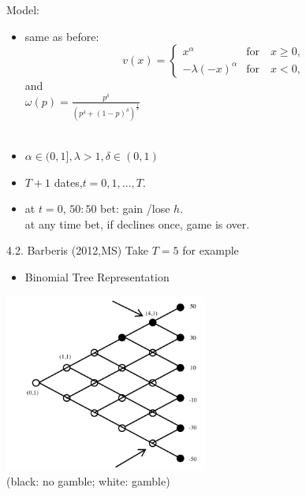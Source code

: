 \documentclass[11pt,aspectratio=169]{beamer}
\begin{document}
\begin{frame}{Model:}
    \begin{itemize}
    \item same as before:
        \begin{equation}
        v(x) = \begin{cases}
            x^\alpha  &  \text{for} \quad x \geq 0,\\
            -\lambda (-x)^\alpha & \text{for} \quad x<0,
            \end{cases}
        \end{equation}\medskip
        and \\
        {\centering $ \omega(p)=\frac{p^\delta }{(p^\delta + (1-p)^\delta)^{\frac{1}{\delta}}} $\\

        }
        \hspace*{\fill} \\ 
    \item $ \alpha \in (0,1], \lambda>1,  \delta \in (0,1) $\\ \medskip
    \item $T+1$ dates,$t=0,1,...,T.$\\ \medskip
    \item at $t=0$, $50:50$ bet: gain /lose $h$.\\
    at any time bet, if declines once, game is over.
    \end{itemize}
\end{frame}

\begin{frame}{4.2. Barberis (2012,MS)}
    Take $T=5$ for example
        \begin{itemize}
            \item  Binomial Tree Representation \medskip
        \end{itemize}
        \includegraphics[width = 0.5\textwidth]{fig2.png}\\
    (black: no gamble; white: gamble)
    \end{frame}
\end{document}
